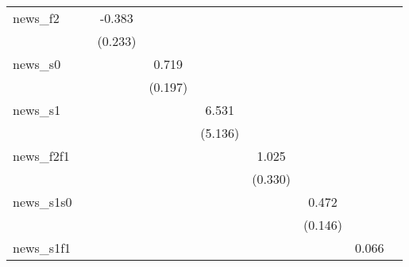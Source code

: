 {\begin{tabular}{l*{8}{c}}
\addlinespace
news\_f2     &                     &      -0.383         &                     &                     &                     &                     &                     &                     \\
            &                     &     (0.233)         &                     &                     &                     &                     &                     &                     \\
\addlinespace
news\_s0     &                     &                     &       0.719\sym{***}&                     &                     &                     &                     &                     \\
            &                     &                     &     (0.197)         &                     &                     &                     &                     &                     \\
\addlinespace
news\_s1     &                     &                     &                     &       6.531         &                     &                     &                     &                     \\
            &                     &                     &                     &     (5.136)         &                     &                     &                     &                     \\
\addlinespace
news\_f2f1   &                     &                     &                     &                     &       1.025\sym{***}&                     &                     &                     \\
            &                     &                     &                     &                     &     (0.330)         &                     &                     &                     \\
\addlinespace
news\_s1s0   &                     &                     &                     &                     &                     &       0.472\sym{***}&                     &                     \\
            &                     &                     &                     &                     &                     &     (0.146)         &                     &                     \\
\addlinespace
news\_s1f1   &                     &                     &                     &                     &                     &                     &       0.066         &                     \\

\end{tabular}}
